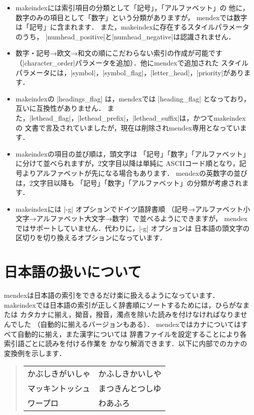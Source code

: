 \documentclass[a4paper]{jsarticle}
\newcommand{\SoftName}[1]{\textsf{#1}}
\begin{document}
\begin{itemize}
\item \SoftName{makeindex}には索引項目の分類として「記号」，「アルファベット」の
  他に，数字のみの項目として「数字」という分類がありますが，
  \SoftName{mendex}では数字は「記号」に含まれます．
  また，\SoftName{makeindex}に存在するスタイルパラメータのうち，
  |numhead_positive|と|numhead_negative|は認識されません．

\item 数字・記号→欧文→和文の順にこだわらない索引の作成が可能です
  （|character_order|パラメータを追加）．他に\SoftName{mendex}で追加された
  スタイルパラメータには，|symbol|，|symbol_flag|，|letter_head|，|priority|があります．

\item \SoftName{makeindex}の |headings_flag| は，\SoftName{mendex}では
  |heading_flag| となっており，互いに互換性がありません．
  また，|lethead_flag|，|lethead_prefix|，|lethead_suffix|は，かつて\SoftName{makeindex}の
  文書で言及されていましたが，現在は削除され\SoftName{mendex}専用となっています．

\item \SoftName{makeindex}の項目の並び順は，頭文字は
  「記号」「数字」「アルファベット」に分けて並べられますが，2文字目以降は単純に
  ASCIIコード順となり，記号よりアルファベットが先になる場合もあります．
  \SoftName{mendex}の英数字の並びは，2文字目以降も
  「記号」「数字」「アルファベット」の分類が考慮されます．

\item \SoftName{makeindex}には |-g| オプションでドイツ語辞書順
  （記号→アルファベット小文字→アルファベット大文字→数字）で並べるようにできますが，
  \SoftName{mendex}ではサポートしていません．代わりに，|-g| オプションは
  日本語の頭文字の区切りを切り換えるオプションになっています．
\end{itemize}

\section{日本語の扱いについて}

\SoftName{mendex}は日本語の索引をできるだけ楽に扱えるようになっています．
\SoftName{makeindex}では日本語の索引が正しく辞書順にソートするためには，ひらがなまたは
カタカナに揃え，拗音，撥音，濁点を除いた読みを付けなければなりませんでした
（自動的に揃えるバージョンもある）．
\SoftName{mendex}ではカナについてはすべて自動的に揃え，また漢字については
辞書ファイルを設定することにより各索引語ごとに読みを付ける作業を
かなり解消できます．以下に内部でのカナの変換例を示します．
%
\begin{quote}
\begin{tabular}{ll}
かぶしきがいしゃ & かふしきかいしや \\
マッキントッシュ & まつきんとつしゆ \\
ワープロ & わあふろ
\end{tabular}
\end{quote}
\end{document}
